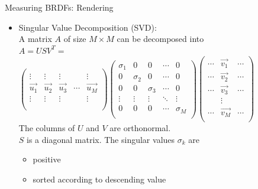 \documentclass[utf8,stillsansserifmath,fleqn,t]{beamer}
\begin{document}
\begin{frame}
\frametitle{\insertsection}
Measuring BRDFs: Rendering
\begin{itemize}
\item Singular Value Decomposition (SVD):\\
    A matrix $A$ of size $M\times M$ can be decomposed into\\[1ex]
        $A = USV^T =$\\[1ex]
        $
        \begin{pmatrix}
         &&&&\\
         \vdots    & \vdots    & \vdots    &        & \vdots\\
         \vec{u_1} & \vec{u_2} & \vec{u_3} & \cdots & \vec{u_M}\\ 
         \vdots    & \vdots    & \vdots    &        & \vdots\\
         &&&&\\
        \end{pmatrix}
        \begin{pmatrix}
         \sigma_1  & 0        & 0        & \cdots & 0\\
         0         & \sigma_2 & 0        & \cdots & 0\\
         0         & 0        & \sigma_3 & \cdots & 0\\
         \vdots    & \vdots   & \vdots   & \ddots & \vdots\\
         0         & 0        & 0        & \cdots & \sigma_M\\
        \end{pmatrix}
        \begin{pmatrix}
         \cdots & \vec{v_1} & \cdots\\
         \cdots & \vec{v_2} & \cdots\\
         \cdots & \vec{v_3} & \cdots\\
                & \vdots    &       \\
         \cdots & \vec{v_M} & \cdots\\
        \end{pmatrix}
        $\\[1ex]
    The columns of $U$ and $V$ are orthonormal.\\[1ex]
    $S$ is a diagonal matrix. The singular values $\sigma_k$ are
    \begin{itemize}
    \item positive
    \item sorted according to descending value
    \end{itemize}
\end{itemize}
\end{frame}
\end{document}
